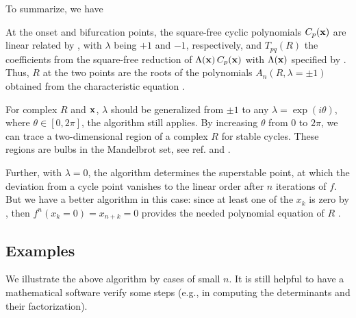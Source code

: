 \documentclass[preprint]{revtex4-1}
\begin{document}
To summarize, we have
\begin{theorem}
  At the onset and bifurcation points,
  the square-free cyclic polynomials $C_p(\mathbf{x})$
  are linear related by , with
  $\lambda$ being $+1$ and $-1$, respectively,
  and $T_{pq}(R)$ the coefficients
  from the square-free reduction of $\Lambda(\mathbf{x}) \, C_p(\mathbf{x})$
  with $\Lambda(\mathbf{x})$ specified by .
  Thus, $R$ at the two points are the roots of the
  polynomials $A_n(R, \lambda = \pm1)$
  obtained from the characteristic equation .
  \label{thm:main}
\end{theorem}

\begin{remark}[1]
  For complex $R$ and $\mathbf{x}$,
  $\lambda$ should be generalized from $\pm1$
  to any $\lambda = \exp(i\theta)$,
  where $\theta \in [0, 2\pi]$,
  the algorithm still applies.
  By increasing $\theta$ from 0 to $2\pi$,
  we can trace a two-dimensional region of a complex $R$
  for stable cycles.
  These regions are bulbs in the Mandelbrot set,
  see ref. \cite{stephenson} and .

  Further, with $\lambda = 0$,
  the algorithm determines the superstable point,
  at which the deviation from a cycle point vanishes
  to the linear order after $n$ iterations of $f$.
  But we have a better algorithm in this case:
  since at least one of the $x_k$ is zero by ,
  then $f^n(x_k = 0) = x_{n+k} = 0$ provides
  the needed polynomial equation of $R$ \cite{strogatz}.
\end{remark}





\subsection{\label{sec:examples}Examples}




We illustrate the above algorithm by cases of small $n$.
%
It is still helpful to have a mathematical software verify some steps
  (e.g., in computing the determinants and their factorization).
\end{document}
